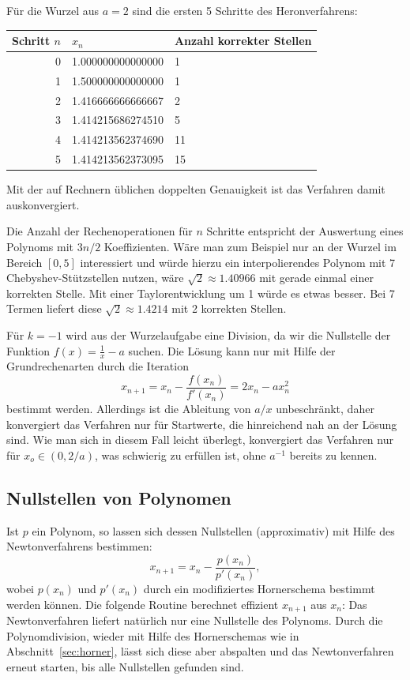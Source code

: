 Für die Wurzel aus $a=2$ sind die ersten 5 Schritte des Heronverfahrens:
\begin{center}
  \begin{tabular}{r|l|l}
    Schritt $n$ & $x_n$ & Anzahl korrekter Stellen \\\hline
    0 & 1.000000000000000 & 1 \\
    1 & 1.500000000000000 & 1 \\
    2 & 1.416666666666667 & 2 \\
    3 & 1.414215686274510 & 5 \\
    4 & 1.414213562374690 & 11 \\ 
    5 & 1.414213562373095 & 15
  \end{tabular}
\end{center}
Mit der auf Rechnern üblichen doppelten Genauigkeit ist das Verfahren
damit auskonvergiert.

Die Anzahl der Rechenoperationen für $n$ Schritte entspricht der
Auswertung eines Polynoms mit $3n/2$ Koeffizienten. Wäre man zum
Beispiel nur an der Wurzel im Bereich $[0,5]$ interessiert und würde
hierzu ein interpolierendes Polynom mit 7 Chebyshev-Stützstellen
nutzen, wäre $\sqrt{2}\approx 1.40966$ mit gerade einmal einer
korrekten Stelle. Mit einer Taylorentwicklung um 1 würde es etwas
besser. Bei 7 Termen liefert diese $\sqrt{2}\approx 1.4214$ mit 2
korrekten Stellen.

Für $k=-1$ wird aus der Wurzelaufgabe eine Division, da wir die
Nullstelle der Funktion $f(x) = \frac{1}{x} - a$ suchen. Die Lösung
kann nur mit Hilfe der Grundrechenarten durch die Iteration
\begin{equation}
  x_{n+1} = x_n - \frac{f(x_n)}{f'(x_n)} = 2x_n - a x_n^2 
\end{equation}
bestimmt werden. Allerdings ist die Ableitung von $a/x$ unbeschränkt,
daher konvergiert das Verfahren nur für Startwerte, die hinreichend
nah an der Lösung sind. Wie man sich in diesem Fall leicht überlegt,
konvergiert das Verfahren nur für $x_o\in (0, 2/a)$, was schwierig zu
erfüllen ist, ohne $a^{-1}$ bereits zu kennen.

\subsection{Nullstellen von Polynomen}

Ist $p$ ein Polynom, so lassen sich dessen Nullstellen (approximativ)
mit Hilfe des Newtonverfahrens bestimmen:
\begin{equation}
  x_{n+1} = x_n - \frac{p(x_n)}{p'(x_n)},
\end{equation}
wobei $p(x_n)$ und $p'(x_n)$ durch ein modifiziertes Hornerschema
bestimmt werden können. Die folgende Routine berechnet effizient
$x_{n+1}$ aus $x_n$:%
%
Das Newtonverfahren liefert natürlich nur eine Nullstelle des
Polynoms. Durch die Polynomdivision, wieder mit Hilfe des
Hornerschemas wie in Abschnitt~\ref{sec:horner}, lässt sich diese
aber abspalten und das Newtonverfahren erneut starten, bis alle
Nullstellen gefunden sind.

